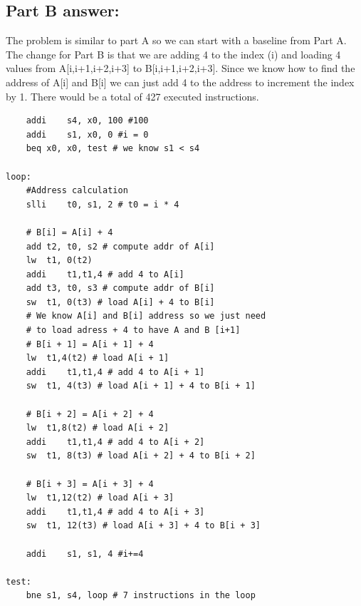 \documentclass{article}
\begin{document}
\subsection*{Part B answer:}
The problem is similar to part A so we can start with a baseline from Part A.
The change for Part B is that we are adding 4 to the index (i) and 
loading 4 values from A[i,i+1,i+2,i+3] to B[i,i+1,i+2,i+3]. Since we know how to 
find the address of A[i] and B[i] we can just add 4 to the address to increment
the index by 1. There would be a total of 427 executed instructions.
\begin{lstlisting}
	addi	s4, x0, 100 #100
	addi	s1, x0, 0 #i = 0
	beq	x0, x0, test # we know s1 < s4
	
loop:	
	#Address calculation
	slli	t0, s1, 2 # t0 = i * 4
	
	# B[i] = A[i] + 4
	add	t2, t0, s2 # compute addr of A[i]
	lw	t1, 0(t2)
	addi	t1,t1,4 # add 4 to A[i]
	add	t3, t0, s3 # compute addr of B[i]
	sw	t1, 0(t3) # load A[i] + 4 to B[i] 
	# We know A[i] and B[i] address so we just need 
	# to load adress + 4 to have A and B [i+1]
	# B[i + 1] = A[i + 1] + 4
	lw	t1,4(t2) # load A[i + 1]
	addi	t1,t1,4 # add 4 to A[i + 1]
	sw	t1, 4(t3) # load A[i + 1] + 4 to B[i + 1] 
	
	# B[i + 2] = A[i + 2] + 4
	lw	t1,8(t2) # load A[i + 2]
	addi	t1,t1,4 # add 4 to A[i + 2]
	sw	t1, 8(t3) # load A[i + 2] + 4 to B[i + 2] 
	
	# B[i + 3] = A[i + 3] + 4
	lw	t1,12(t2) # load A[i + 3]
	addi	t1,t1,4 # add 4 to A[i + 3]
	sw	t1, 12(t3) # load A[i + 3] + 4 to B[i + 3] 
	
	addi	s1, s1, 4 #i+=4
	
test: 	
	bne	s1, s4, loop # 7 instructions in the loop
\end{lstlisting}
\end{document}
